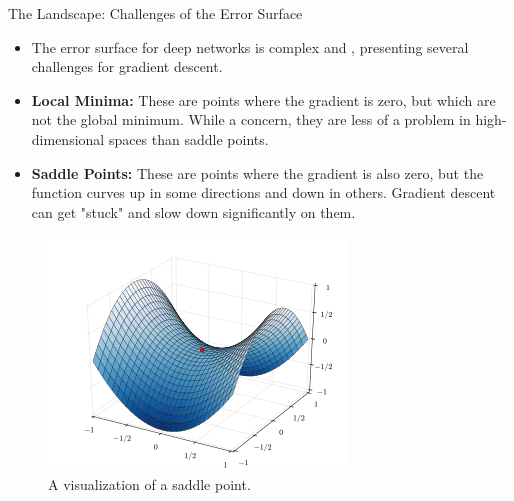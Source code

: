 \begin{frame}{The Landscape: Challenges of the Error Surface}
    \begin{itemize}
        \item The error surface for deep networks is complex and , presenting several challenges for gradient descent.
        \item \textbf{Local Minima:} These are points where the gradient is zero, but which are not the global minimum. While a concern, they are less of a problem in high-dimensional spaces than saddle points.
        \item \textbf{Saddle Points:} These are points where the gradient is also zero, but the function curves up in some directions and down in others. Gradient descent can get "stuck" and slow down significantly on them.
    \end{itemize}
    \begin{figure}
        \centering
        \includegraphics[width=0.4\linewidth]{images/saddle_point.png}
        \caption{A visualization of a saddle point.}
    \end{figure}
\end{frame}


